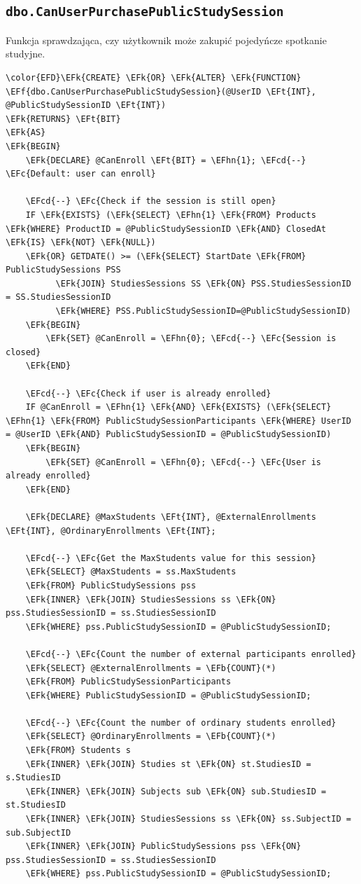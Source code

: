 \documentclass[11pt]{article}
\newcommand{\EFc}[1]{\textcolor{EFc}{\textit{#1}}} %
\newcommand{\EFcd}[1]{\textcolor{EFcd}{\textit{#1}}} %
\newcommand{\EFk}[1]{\textcolor{EFk}{\textbf{#1}}} %
\newcommand{\EFb}[1]{\textcolor{EFb}{\textbf{#1}}} %
\newcommand{\EFf}[1]{\textcolor{EFf}{#1}} %
\newcommand{\EFt}[1]{\textcolor{EFt}{\textbf{#1}}} %
\newcommand{\EFhn}[1]{\textcolor{EFhn}{#1}} %
\begin{document}
\subsection{\texttt{dbo.CanUserPurchasePublicStudySession}}
\label{sec:org7890042}
Funkcja sprawdzająca, czy użytkownik może zakupić pojedyńcze spotkanie studyjne.
\begin{Code}
\begin{Verbatim}
\color{EFD}\EFk{CREATE} \EFk{OR} \EFk{ALTER} \EFk{FUNCTION} \EFf{dbo.CanUserPurchasePublicStudySession}(@UserID \EFt{INT}, @PublicStudySessionID \EFt{INT})
\EFk{RETURNS} \EFt{BIT}
\EFk{AS}
\EFk{BEGIN}
    \EFk{DECLARE} @CanEnroll \EFt{BIT} = \EFhn{1}; \EFcd{--} \EFc{Default: user can enroll}

    \EFcd{--} \EFc{Check if the session is still open}
    IF \EFk{EXISTS} (\EFk{SELECT} \EFhn{1} \EFk{FROM} Products \EFk{WHERE} ProductID = @PublicStudySessionID \EFk{AND} ClosedAt \EFk{IS} \EFk{NOT} \EFk{NULL})
    \EFk{OR} GETDATE() >= (\EFk{SELECT} StartDate \EFk{FROM} PublicStudySessions PSS
          \EFk{JOIN} StudiesSessions SS \EFk{ON} PSS.StudiesSessionID = SS.StudiesSessionID
          \EFk{WHERE} PSS.PublicStudySessionID=@PublicStudySessionID)
    \EFk{BEGIN}
        \EFk{SET} @CanEnroll = \EFhn{0}; \EFcd{--} \EFc{Session is closed}
    \EFk{END}

    \EFcd{--} \EFc{Check if user is already enrolled}
    IF @CanEnroll = \EFhn{1} \EFk{AND} \EFk{EXISTS} (\EFk{SELECT} \EFhn{1} \EFk{FROM} PublicStudySessionParticipants \EFk{WHERE} UserID = @UserID \EFk{AND} PublicStudySessionID = @PublicStudySessionID)
    \EFk{BEGIN}
        \EFk{SET} @CanEnroll = \EFhn{0}; \EFcd{--} \EFc{User is already enrolled}
    \EFk{END}

    \EFk{DECLARE} @MaxStudents \EFt{INT}, @ExternalEnrollments \EFt{INT}, @OrdinaryEnrollments \EFt{INT};

    \EFcd{--} \EFc{Get the MaxStudents value for this session}
    \EFk{SELECT} @MaxStudents = ss.MaxStudents 
    \EFk{FROM} PublicStudySessions pss
    \EFk{INNER} \EFk{JOIN} StudiesSessions ss \EFk{ON} pss.StudiesSessionID = ss.StudiesSessionID
    \EFk{WHERE} pss.PublicStudySessionID = @PublicStudySessionID;

    \EFcd{--} \EFc{Count the number of external participants enrolled}
    \EFk{SELECT} @ExternalEnrollments = \EFb{COUNT}(*) 
    \EFk{FROM} PublicStudySessionParticipants
    \EFk{WHERE} PublicStudySessionID = @PublicStudySessionID;

    \EFcd{--} \EFc{Count the number of ordinary students enrolled}
    \EFk{SELECT} @OrdinaryEnrollments = \EFb{COUNT}(*) 
    \EFk{FROM} Students s
    \EFk{INNER} \EFk{JOIN} Studies st \EFk{ON} st.StudiesID = s.StudiesID
    \EFk{INNER} \EFk{JOIN} Subjects sub \EFk{ON} sub.StudiesID = st.StudiesID
    \EFk{INNER} \EFk{JOIN} StudiesSessions ss \EFk{ON} ss.SubjectID = sub.SubjectID
    \EFk{INNER} \EFk{JOIN} PublicStudySessions pss \EFk{ON} pss.StudiesSessionID = ss.StudiesSessionID
    \EFk{WHERE} pss.PublicStudySessionID = @PublicStudySessionID;


\end{Verbatim}
\end{Code}
\end{document}
